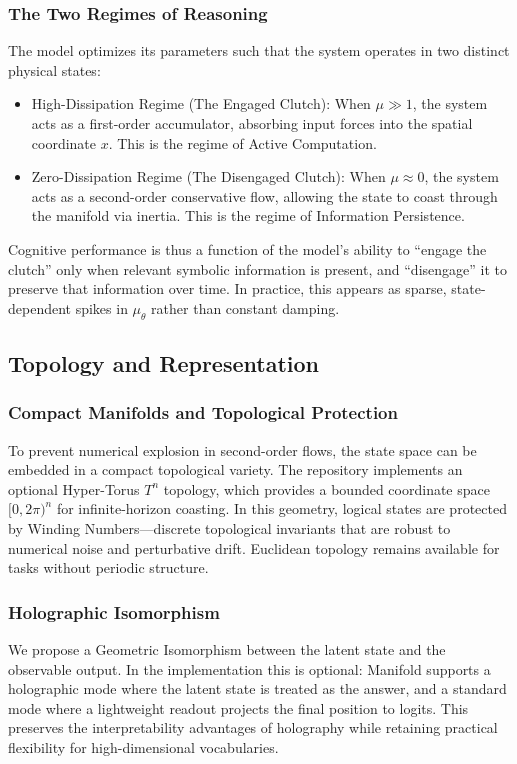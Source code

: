 \documentclass{article}
\numberwithin{equation}{section}
\begin{document}
\subsubsection{The Two Regimes of Reasoning}
The model optimizes its parameters such that the system operates in two distinct physical states:
\begin{itemize}
\item High-Dissipation Regime (The Engaged Clutch): When $\mu \gg 1$, the system acts as a first-order accumulator, absorbing input forces into the spatial coordinate $x$. This is the regime of Active Computation.
\item Zero-Dissipation Regime (The Disengaged Clutch): When $\mu \approx 0$, the system acts as a second-order conservative flow, allowing the state to coast through the manifold via inertia. This is the regime of Information Persistence.
\end{itemize}
Cognitive performance is thus a function of the model's ability to ``engage the clutch'' only when relevant symbolic information is present, and ``disengage'' it to preserve that information over time. In practice, this appears as sparse, state-dependent spikes in $\mu_\theta$ rather than constant damping.

\subsection{Topology and Representation}
\subsubsection{Compact Manifolds and Topological Protection}
To prevent numerical explosion in second-order flows, the state space can be embedded in a compact topological variety. The repository implements an optional Hyper-Torus $T^n$ topology, which provides a bounded coordinate space $[0, 2\pi)^n$ for infinite-horizon coasting. In this geometry, logical states are protected by Winding Numbers---discrete topological invariants that are robust to numerical noise and perturbative drift. Euclidean topology remains available for tasks without periodic structure.

\subsubsection{Holographic Isomorphism}
We propose a Geometric Isomorphism between the latent state and the observable output. In the implementation this is optional: Manifold supports a holographic mode where the latent state is treated as the answer, and a standard mode where a lightweight readout projects the final position to logits. This preserves the interpretability advantages of holography while retaining practical flexibility for high-dimensional vocabularies.
\end{document}
